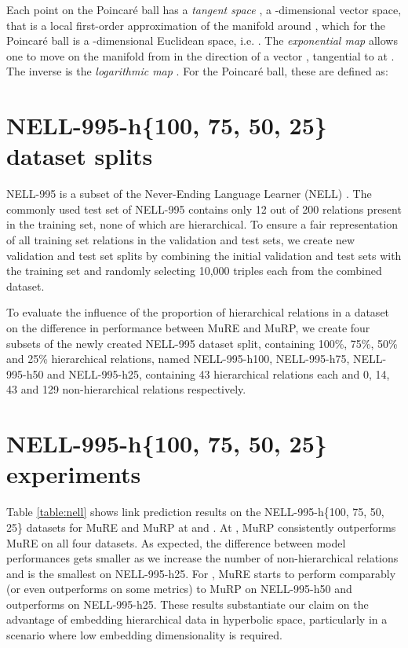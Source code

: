 \documentclass{article}
\begin{document}
Each point on the Poincar{\'e} ball  has a \textit{tangent space} , a -dimensional vector space, that is a local first-order approximation of the manifold  around , which for the Poincar{\'e} ball  is a -dimensional Euclidean space, i.e. . The \textit{exponential map}  allows one to move on the manifold from  in the direction of a vector , tangential to  at . The inverse is the \textit{logarithmic map} . For the Poincar{\'e} ball, these are defined \cite{ganea2018hyperbolic} as:





\section{NELL-995-h\{100, 75, 50, 25\} dataset splits}\label{sec:nell}

NELL-995 \cite{xiong2017deeppath} is a subset of the Never-Ending Language Learner (NELL) \cite{carlson2010toward}. The commonly used test set of NELL-995 \cite{xiong2017deeppath} contains only 12 out of 200 relations present in the training set, none of which are hierarchical. To ensure a fair representation of all training set relations in the validation and test sets, we create new validation and test set splits by combining the initial validation and test sets with the training set and randomly selecting 10,000 triples each from the combined dataset. 

To evaluate the influence of the proportion of hierarchical relations in a dataset on the difference in performance between MuRE and MuRP, we create four subsets of the newly created NELL-995 dataset split, containing 100\%, 75\%, 50\% and 25\% hierarchical relations, named NELL-995-h100, NELL-995-h75, NELL-995-h50 and NELL-995-h25, containing 43 hierarchical relations each and 0, 14, 43 and 129 non-hierarchical relations respectively.


\section{NELL-995-h\{100, 75, 50, 25\} experiments}\label{sec:nell_experiments}

Table \ref{table:nell} shows link prediction results on the NELL-995-h\{100, 75, 50, 25\} datasets for MuRE and MuRP at  and . At , MuRP consistently outperforms MuRE on all four datasets. As expected, the difference between model performances gets smaller as we increase the number of non-hierarchical relations and is the smallest on NELL-995-h25. For , MuRE starts to perform comparably (or even outperforms on some metrics) to MuRP on NELL-995-h50 and outperforms on NELL-995-h25. These results substantiate our claim on the advantage of embedding hierarchical data in hyperbolic space, particularly in a scenario where low embedding dimensionality is required. 
\end{document}
